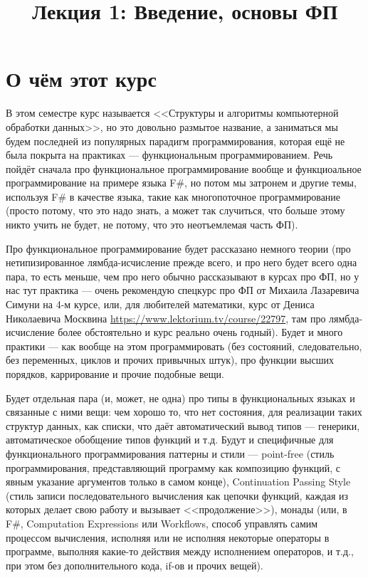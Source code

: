 \documentclass[a5paper]{article}
\title{Лекция 1: Введение, основы ФП}
\date{}
\begin{document}
\maketitle
\thispagestyle{empty}

\section{О чём этот курс}
В этом семестре курс называется <<Структуры и алгоритмы компьютерной обработки данных>>, но это довольно размытое название, а заниматься мы будем последней из популярных парадигм программирования, которая ещё не была покрыта на практиках --- функциональным программированием. Речь пойдёт сначала про функциональное программирование вообще и функциоальное программирование на примере языка F\#, но потом мы затронем и другие темы, используя F\# в качестве языка, такие как многопоточное программирование (просто потому, что это надо знать, а может так случиться, что больше этому никто учить не будет, не потому, что это неотъемлемая часть ФП).

Про функциональное программирование будет рассказано немного теории (про нетипизированное лямбда-исчисление прежде всего, и про него будет всего одна пара, то есть меньше, чем про него обычно рассказывают в курсах про ФП, но у нас тут практика --- очень рекомендую спецкурс про ФП от Михаила Лазаревича Симуни на 4-м курсе, или, для любителей математики, курс от Дениса Николаевича Москвина \url{https://www.lektorium.tv/course/22797}, там про лямбда-исчисление более обстоятельно и курс реально очень годный). Будет и много практики --- как вообще на этом программировать (без состояний, следовательно, без переменных, циклов и прочих привычных штук), про функции высших порядков, каррирование и прочие подобные вещи.

Будет отдельная пара (и, может, не одна) про типы в функциональных языках и связанные с ними вещи: чем хорошо то, что нет состояния, для реализации таких структур данных, как списки, что даёт автоматический вывод типов --- генерики, автоматическое обобщение типов функций и т.д. Будут и специфичные для функционального программирования паттерны и стили --- point-free (стиль программирования, представляющий программу как композицию функций, с явным указание аргументов только в самом конце), Continuation Passing Style (стиль записи последовательного вычисления как цепочки функций, каждая из которых делает свою работу и вызывает <<продолжение>>), монады (или, в F\#, Computation Expressions или Workflows, способ управлять самим процессом вычисления, исполняя или не исполняя некоторые операторы в программе, выполняя какие-то действия между исполнением операторов, и т.д., при этом без дополнительного кода, if-ов и прочих вещей).
\end{document}
